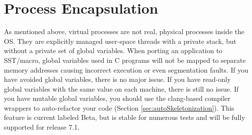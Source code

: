 \section{Process Encapsulation}
\label{sec:processEncapsulation}
As mentioned above, virtual processes are not real, physical processes inside the OS.
They are explicitly managed user-space threads with a private stack, but without a private set of global variables.
When porting an application to SST/macro, global variables used in C programs will not be mapped to separate memory addresses causing incorrect execution or even segmentation faults.
If you have avoided global variables, there is no major issue.  
If you have read-only global variables with the same value on each machine, there is still no issue.
If you have mutable global variables, you should use the  clang-based compiler wrappers to auto-refactor your code (Section \ref{sec:autoSkeletonization}).
This feature is current labeled Beta, but is stable for numerous tests and will be fully supported for release 7.1.


